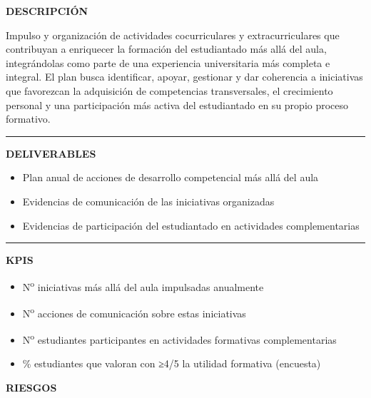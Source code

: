 \documentclass[11pt,a4paper]{scrreprt}
\newcommand{\fieldlabel}[1]{%
  {\footnotesize\sffamily\bfseries\color{mutedcolor}\MakeUppercase{#1}}\par\nopagebreak[4]
}
\newcommand{\fieldsep}{\vspace{3pt}\noindent\textcolor{bordercolor}{\rule{\linewidth}{0.4pt}}\vspace{3pt}\par}
\begin{document}
\begin{tcolorbox}[pabox={e360color}{PA5.1 \enspace\textbullet\enspace Impulso de la formación más allá del aula}]

\fieldlabel{Descripci\'on}
{\small Impulso y organización de actividades cocurriculares y extracurriculares que contribuyan a enriquecer la formación del estudiantado más allá del aula, integrándolas como parte de una experiencia universitaria más completa e integral. El plan busca identificar, apoyar, gestionar y dar coherencia a iniciativas que favorezcan la adquisición de competencias transversales, el crecimiento personal y una participación más activa del estudiantado en su propio proceso formativo. }\par
\fieldsep
\fieldlabel{Deliverables}
{\small \begin{itemize}[noitemsep,topsep=2pt]
\item Plan anual de acciones de desarrollo competencial más allá del aula
\item Evidencias de comunicación de las iniciativas organizadas
\item Evidencias de participación del estudiantado en actividades complementarias
\end{itemize}}\par
\fieldsep
\fieldlabel{KPIs}
{\small \begin{itemize}[noitemsep,topsep=2pt]
\item N\textsuperscript{o} iniciativas más allá del aula impulsadas anualmente
\item N\textsuperscript{o} acciones de comunicación sobre estas iniciativas
\item N\textsuperscript{o} estudiantes participantes en actividades formativas complementarias
\item \% estudiantes que valoran con ≥4/5 la utilidad formativa (encuesta)
\end{itemize}}\par
\end{tcolorbox}
\begin{tcolorbox}[riskbox]
{\footnotesize\sffamily\bfseries\color{red!50!black} RIESGOS}\par{}
\end{tcolorbox}
\end{document}

